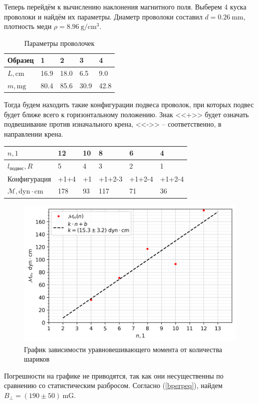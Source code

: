\documentclass[12pt, a4paper]{article}
\begin{document}
Теперь перейдём к вычислению наклонения магнитного поля.
Выберем 4 куска проволоки и найдём их параметры. Диаметр проволоки составил $d=0.26~\mathrm{mm}$, плотность меди $\rho = 8.96~\mathrm{g/cm^3}$.
\begin{table}[H]
\centering
\begin{tabular}{|l|l|l|l|l|}
\hline
Образец          & 1    & 2    & 3    & 4    \\ \hline
$L, \mathrm{cm}$ & 16.9 & 18.0 & 6.5  & 9.0  \\ \hline
$m, \mathrm{mg}$ & 80.4 & 85.6 & 30.9 & 42.8 \\ \hline
\end{tabular}
\caption{Параметры проволочек}
\end{table}

Тогда будем находить такие конфигурации подвеса проволок, при которых подвес будет ближе всего к горизонтальному положению. Знак <<+>> будет означать подвешивание против изначального крена, <<->> -- соответственно, в направлении крена.

\begin{table}[H]
\begin{tabular}{|l|l|l|l|l|l|}
\hline
$n, 1$                                 & 12   & 10 & 8      & 6      & 4      \\ \hline
$l_{подвес}, R$                        & 5    & 4  & 3      & 2      & 1      \\ \hline
Конфигурация                           & +1+4 & +1 & +1+2-3 & +1+2-4 & +1+2-4 \\ \hline
$\mathcal{M}, \text{dyn}\cdot\text{cm}$ & 178  & 93 & 117    & 71     & 36     \\ \hline
\end{tabular}
\end{table}

\begin{figure}[H]
\centering
\includegraphics[width=0.8\linewidth]{pics/plot_mn_n.png}
\caption{График зависимости уравновешивающего момента от количества шариков}
\label{plot_mn_n}
\end{figure}
Погрешности на графике не приводятся, так как они несущественны по сравнению со статистическим разбросом. 
Согласно (\ref{bperpeq}), найдем $B_\perp = (190\pm50)~\text{mG}$.
\end{document}
